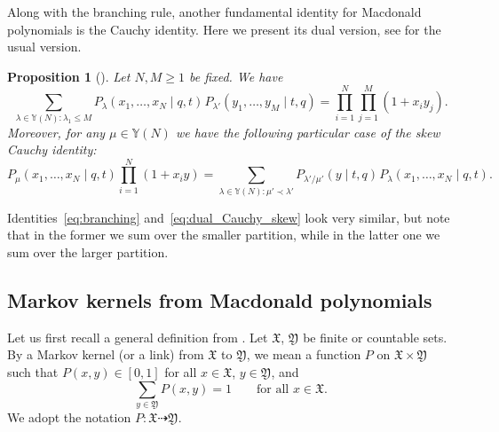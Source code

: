 \documentclass[pdftex]{sigma}
\numberwithin{equation}{section}
\newtheorem{Proposition}[Theorem]{Proposition}
{ \theoremstyle{definition}
\newtheorem{Definition}[Theorem]{Definition}}
\begin{document}
Along with the branching rule, another fundamental
identity for Macdonald polynomials is the Cauchy identity.
Here we present its dual version, see \cite[Chapter~VI.4]{Macdonald1995} for the
usual version.

\begin{Proposition}[{\cite[formula~(VI.5.4) and Chapter~VI.7]{Macdonald1995}}]
	\label{prop:dual_Cauchy_identity}
	Let $N,M\ge 1$ be fixed. We have
	\begin{equation*}%
		\sum_{\lambda\in \mathbb{Y}(N)\colon \lambda_1\le M}
		P_\lambda(x_1,\dots,x_N \mid q,t)
		\hspace{1pt}
		P_{\lambda'}(y_1,\dots,y_M\mid t,q )=
		\prod_{i=1}^{N}\prod_{j=1}^{M}(1+x_iy_j).
	\end{equation*}
	Moreover, for any $\mu\in \mathbb{Y}(N)$ we have
	the following particular case of
	the skew Cauchy identity:
	\begin{equation}		\label{eq:dual_Cauchy_skew}
		P_\mu(x_1,\dots,x_N\mid q,t )
		\prod_{i=1}^{N}(1+x_iy)=
		\sum_{\lambda\in \mathbb{Y}(N)\colon \mu'\prec \lambda'}
		P_{\lambda'/\mu'}(y\mid t,q)
		\hspace{1pt}
		P_\lambda(x_1,\dots,x_N\mid q,t ).
	\end{equation}
\end{Proposition}
Identities~\eqref{eq:branching} and~\eqref{eq:dual_Cauchy_skew} look very similar, but note that
in the former we sum over the smaller partition, while in the latter one we sum over the larger partition.

\subsection{Markov kernels from Macdonald polynomials}\label{eq:Markov_kernels_from_Cauchy}

Let us first recall a general definition from
\cite[Chapter~7]{borodin2016representations}.
Let $\mathfrak{X}$, $\mathfrak{Y}$ be
finite or countable sets. By a Markov kernel
(or a link) from $\mathfrak{X}$ to $\mathfrak{Y}$,
we mean a function $P$ on $\mathfrak{X}\times \mathfrak{Y}$
such that
$P(x,y)\in[0,1]$ for all $x\in \mathfrak{X}$, $y\in \mathfrak{Y}$,
and
\begin{equation*}
	\sum_{y\in \mathfrak{Y}}P(x,y)=1
	\qquad
	\text{for all $x\in \mathfrak{X}$}.
\end{equation*}
We adopt the notation $P\colon \mathfrak{X}\dashrightarrow \mathfrak{Y}$.
\end{document}
